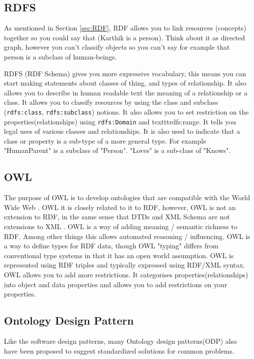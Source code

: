 \subsection{RDFS}
As mentioned in Section \ref{sec:RDF}, RDF allows you to link resources (concepts) together so you could say that (Karthik  is a person). Think about it as directed graph, however you can't classify objects so you can't say for example that person is a subclass of human-beings.

RDFS (RDF Schema) gives you more expressive vocabulary, this means you can start making statements about classes of thing, and types of relationship. It also allows you to describe in human readable text the meaning of a relationship or a class.
It allows you to classify resources by using the class and subclass (\texttt{rdfs:class}, \texttt{rdfs:subclass}) notions. It also allows you to set restriction on the properties(relationships) using \texttt{rdfs:Domain} and texttt{rdfs:range}.
It tells you legal uses of various classes and relationships. It is also used to indicate that a class or property is a sub-type of a more general type. For example "HumanParent" is a subclass of "Person". "Loves" is a sub-class of "Knows"\cite{RDFvsOWL_SO}.

\subsection{OWL}
The purpose of OWL is to develop ontologies that are compatible with the World Wide Web \cite{RDFandOWL_SenmanticWebAffinityGroup}.
OWL it is closely related to it to RDF, however, OWL is not an extension to RDF, in the same sense that DTDs and XML Schema are not extensions to XML \cite{RDFvsOWLquora}. 
OWL is a way of adding meaning / semantic richness to RDF.  Among other things this allows automated reasoning / influencing.
OWL is a way to define types for RDF data, though OWL "typing"  differs from conventional type systems in that it has an open world  assumption. OWL is represented using RDF triples and typically expressed using RDF/XML syntax.
OWL allows you to add more restrictions. It categorises properties(relationships) into object and data properties and allows you to add restrictions on your properties.

\subsection{Ontology Design Pattern}
Like the software design patterns, many Ontology design patterns(ODP) \cite{ODP}
also have been proposed to suggest standardized solutions for common problems.


